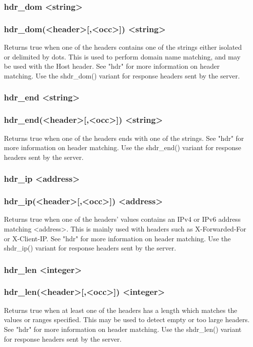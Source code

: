 \subsubsection[hdr\_dom]{hdr\_dom <string>}
\subsubsection*{hdr\_dom(<header>[,<occ>]) <string>}
  Returns true when one of the headers contains one of the strings either
  isolated or delimited by dots. This is used to perform domain name matching,
  and may be used with the Host header. See "hdr" for more information on
  header matching. Use the shdr\_dom() variant for response headers sent by the
  server.

\subsubsection[hdr\_end]{hdr\_end <string>}
\subsubsection*{hdr\_end(<header>[,<occ>]) <string>}
  Returns true when one of the headers ends with one of the strings. See "hdr"
  for more information on header matching. Use the shdr\_end() variant for
  response headers sent by the server.

\subsubsection[hdr\_ip]{hdr\_ip <address>}
\subsubsection*{hdr\_ip(<header>[,<occ>]) <address>}
  Returns true when one of the headers' values contains an IPv4 or IPv6 address
  matching <address>. This is mainly used with headers such as X-Forwarded-For
  or X-Client-IP. See "hdr" for more information on header matching. Use the
  shdr\_ip() variant for response headers sent by the server.

\subsubsection[hdr\_len]{hdr\_len <integer>}
\subsubsection*{hdr\_len(<header>[,<occ>]) <integer>}
  Returns true when at least one of the headers has a length which matches the
  values or ranges specified. This may be used to detect empty or too large
  headers. See "hdr" for more information on header matching. Use the
  shdr\_len() variant for response headers sent by the server.

